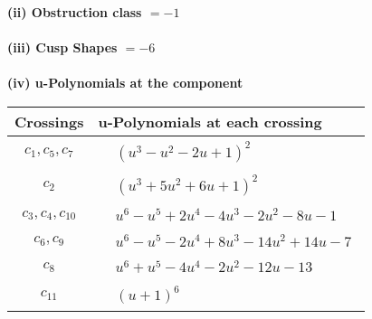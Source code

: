 \documentclass[1p]{elsarticle_modified}
\theoremstyle{definition}
\begin{document}
\flushleft \textbf{(ii) Obstruction class $= -1$}\\~\\
\flushleft \textbf{(iii) Cusp Shapes $= -6$}\\~\\
\newpage\renewcommand{\arraystretch}{1}
\flushleft \textbf{(iv) u-Polynomials at the component}\newline \\
\begin{tabular}{m{50pt}|m{274pt}}
Crossings & \hspace{64pt}u-Polynomials at each crossing \\
\hline $$\begin{aligned}c_{1},c_{5},c_{7}\end{aligned}$$&$\begin{aligned}
&(u^3- u^2-2 u+1)^2
\end{aligned}$\\
\hline $$\begin{aligned}c_{2}\end{aligned}$$&$\begin{aligned}
&(u^3+5 u^2+6 u+1)^2
\end{aligned}$\\
\hline $$\begin{aligned}c_{3},c_{4},c_{10}\end{aligned}$$&$\begin{aligned}
&u^6- u^5+2 u^4-4 u^3-2 u^2-8 u-1
\end{aligned}$\\
\hline $$\begin{aligned}c_{6},c_{9}\end{aligned}$$&$\begin{aligned}
&u^6- u^5-2 u^4+8 u^3-14 u^2+14 u-7
\end{aligned}$\\
\hline $$\begin{aligned}c_{8}\end{aligned}$$&$\begin{aligned}
&u^6+u^5-4 u^4-2 u^2-12 u-13
\end{aligned}$\\
\hline $$\begin{aligned}c_{11}\end{aligned}$$&$\begin{aligned}
&(u+1)^6
\end{aligned}$\\
\hline
\end{tabular}\\~\\
\end{document}
